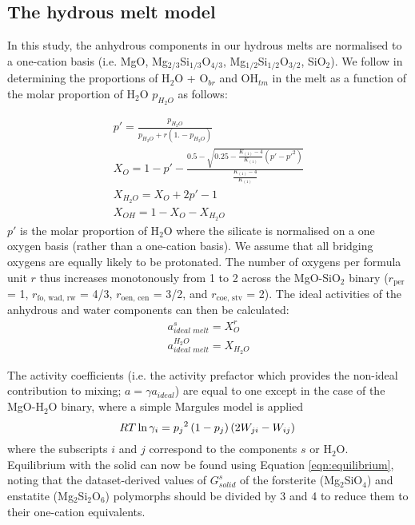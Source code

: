 \documentclass[review]{elsarticle}
\begin{document}
\subsection{The hydrous melt model}

In this study, the anhydrous components in our hydrous melts are normalised to a one-cation basis (i.e. MgO, Mg$_{2/3}$Si$_{1/3}$O$_{4/3}$, Mg$_{1/2}$Si$_{1/2}$O$_{3/2}$, SiO$_2$). We follow \cite{SS1985} in determining the proportions of H$_2$O + O$_{br}$ and OH$_{tm}$  in the melt as a function of the molar proportion of H$_2$O $p_{H_2O}$ as follows:
 
\begin{eqnarray}
p' = \frac{p_{H_2O}}{p_{H_2O}  + r \left(1.-p_{H_2O} \right)} \\
X_O = 1 - p' - \frac{ 0.5 - \sqrt{ 0.25 - \frac{K_{(1)}-4}{K_{(1)}} \left(p'-p'^2 \right)}}{\frac{K_{(1)}-4}{K_{(1)}} }\\
X_{H_2O} = X_O + 2 p' - 1 \\
X_{OH} = 1 - X_O - X_{H_2O}
\end{eqnarray}
\noindent $p'$ is the molar proportion of H$_2$O where the silicate is normalised on a one oxygen basis (rather than a one-cation basis). We assume that all bridging oxygens are equally likely to be protonated. The number of oxygens per formula unit $r$ thus increases monotonously from 1 to 2 across the MgO-SiO$_2$ binary ($r_{\textrm{per}}$ = 1, $r_{\textrm{fo, wad, rw}}$ = 4/3, $r_{\textrm{oen, cen}}$ = 3/2, and $r_{\textrm{coe, stv}}$ = 2). The ideal activities of the anhydrous and water components can then be calculated:
\begin{eqnarray}
a^{\textit{s}}_{\textit{ideal melt}} =X_O^r \\
a^{H_2O}_{\textit{ideal melt}} = X_{H_2O}
\end{eqnarray}

The activity coefficients (i.e. the activity prefactor which provides the non-ideal contribution to mixing; $a = \gamma a_{ideal}$) are equal to one except in the case of the MgO-H$_2$O binary, where a simple Margules model is applied \citep{HM2012}
\begin{equation}
RT \ln \gamma_i = {p_j}^2 \left( 1 - p_j \right) \left( 2 W_{ji} - W_{ij} \right) \\
\end{equation}
\noindent where the subscripts $i$ and $j$ correspond to the components $s$ or H$_2$O. Equilibrium with the solid can now be found using Equation \ref{eqn:equilibrium}, noting that the dataset-derived values of $G^s_{solid}$ of the forsterite (Mg$_2$SiO$_4$) and enstatite (Mg$_2$Si$_2$O$_6$) polymorphs should be divided by 3 and 4 to reduce them to their one-cation equivalents.
\end{document}
